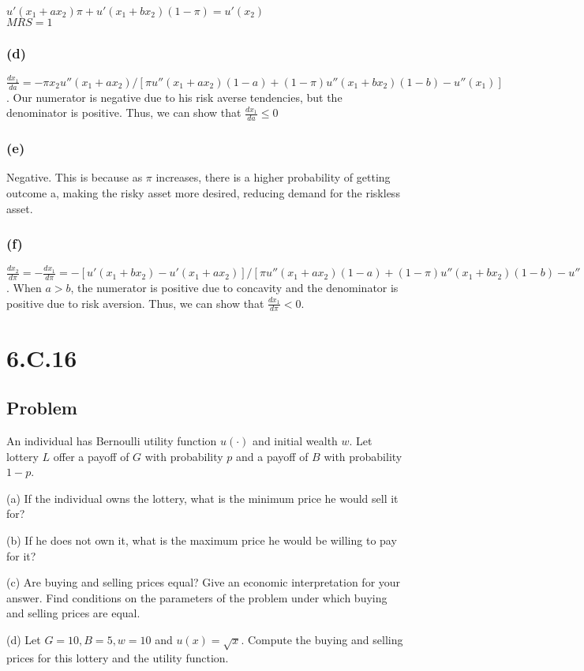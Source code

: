 \documentclass[10pt, a4paper]{article}
\begin{document}
        $u'(x_1+ax_2)\pi + u'(x_1 + bx_2)(1-\pi) = u'(x_2)$ \\

        $MRS = 1$
      \subsubsection*{(d)}
        $\frac{dx_1}{da} = -\pi x_2u''(x_1+ax_2)/[\pi u''(x_1+ax_2)(1-a) + (1-\pi)u''(x_1+bx_2)(1-b) - u''(x_1)]$. Our numerator is negative due to his risk averse tendencies, but the denominator is positive. Thus, we can show that $\frac{dx_1}{da}\leq 0$
      \subsubsection*{(e)}
          Negative. This is because as $\pi$ increases, there is a higher probability of getting outcome a, making the risky asset more desired, reducing demand for the riskless asset. 
      \subsubsection*{(f)}
        $\frac{dx_2}{d\pi} = -\frac{dx_1}{d\pi} = -[u'(x_1+bx_2) - u'(x_1+ax_2)]/[\pi u''(x_1 + ax_2)(1-a)+(1-\pi)u''(x_1+bx_2)(1-b)-u''(x_1)]$. When $a>b$, the numerator is positive due to concavity and the denominator is positive due to risk aversion. Thus, we can show that $\frac{dx_1}{d\pi}<0$.
  \section*{6.C.16}
    \subsection*{Problem}
      An individual has Bernoulli utility function $u(\cdot)$ and initial wealth $w$. Let lottery $L$ offer a payoff of $G$ with probability $p$ and a payoff of $B$ with probability $1-p$.

      (a) If the individual owns the lottery, what is the minimum price he would sell it for?

      (b) If he does not own it, what is the maximum price he would be willing to pay for it?

      (c) Are buying and selling prices equal? Give an economic interpretation for your answer. Find conditions on the parameters of the problem under which buying and selling prices are equal.

      (d) Let $G=10, B=5, w=10$ and $u(x) = \sqrt{x}$. Compute the buying and selling prices for this lottery and the utility function. 
\end{document}
